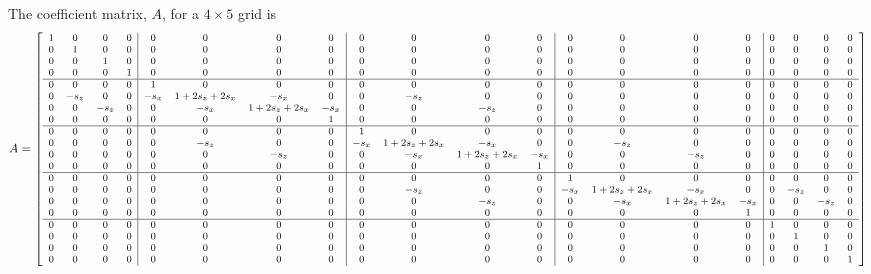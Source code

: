 \begin{landscape}
 	The coefficient matrix, $A$, for a $4 \times 5$ grid is
\begin{equation}
\setcounter{MaxMatrixCols}{20}
\footnotesize{
A = \begin{bmatrix}
    \begin{array}{cccc|cccc|cccc|cccc|cccc}
       1 & 0 & 0 & 0 & 0 & 0 & 0 & 0 & 0 & 0 & 0 & 0 & 0 & 0 & 0 & 0 & 0 & 0 & 0 & 0 \\ %
       0 & 1 & 0 & 0 & 0 & 0 & 0 & 0 & 0 & 0 & 0 & 0 & 0 & 0 & 0 & 0 & 0 & 0 & 0 & 0 \\ %
       0 & 0 & 1 & 0 & 0 & 0 & 0 & 0 & 0 & 0 & 0 & 0 & 0 & 0 & 0 & 0 & 0 & 0 & 0 & 0 \\ %
       0 & 0 & 0 & 1 & 0 & 0 & 0 & 0 & 0 & 0 & 0 & 0 & 0 & 0 & 0 & 0 & 0 & 0 & 0 & 0 \\ %
         \hline
       0 & 0 & 0 & 0 & 1 & 0 & 0 & 0 & 0 & 0 & 0 & 0 & 0 & 0 & 0 & 0 & 0 & 0 & 0 & 0 \\ %
       0 & -s_z & 0 & 0 & -s_x & 1+2s_z+2s_x & -s_x & 0 & 0 & -s_z & 0 & 0 & 0 & 0 & 0 & 0 & 0 & 0 & 0 & 0 \\ %
       0 & 0 & -s_z & 0 & 0 & -s_x & 1+2s_z+2s_x & -s_x & 0 & 0 & -s_z & 0 & 0 & 0 & 0 & 0 & 0 & 0 & 0 & 0 \\ %
       0 & 0 & 0 & 0 & 0 & 0 & 0 & 1 & 0 & 0 & 0 & 0 & 0 & 0 & 0 & 0 & 0 & 0 & 0 & 0 \\ %
       \hline
       0 & 0 & 0 & 0 & 0 & 0 & 0 & 0 & 1 & 0 & 0 & 0 & 0 & 0 & 0 & 0 & 0 & 0 & 0 & 0 \\ %
       0 & 0 & 0 & 0 & 0 & -s_z & 0 & 0 & -s_x & 1+2s_z+2s_x & -s_x & 0 & 0 & -s_z & 0 & 0 & 0 & 0 & 0 & 0 \\ %
       0 & 0 & 0 & 0 & 0 & 0 & -s_z & 0 & 0 & -s_x & 1+2s_z+2s_x & -s_x & 0 & 0 & -s_z & 0 & 0 & 0 & 0 & 0 \\ %
       0 & 0 & 0 & 0 & 0 & 0 & 0 & 0 & 0 & 0 & 0 & 1 & 0 & 0 & 0 & 0 & 0 & 0 & 0 & 0 \\ %
       \hline
       0 & 0 & 0 & 0 & 0 & 0 & 0 & 0 & 0 & 0 & 0 & 0 & 1 & 0 & 0 & 0 & 0 & 0 & 0 & 0 \\ %
       0 & 0 & 0 & 0 & 0 & 0 & 0 & 0 & 0 & -s_z & 0 & 0 & -s_x & 1+2s_z+2s_x & -s_x & 0 & 0 & -s_z & 0 & 0 \\ %
       0 & 0 & 0 & 0 & 0 & 0 & 0 & 0 & 0 & 0 & -s_z & 0 & 0 & -s_x & 1+2s_z+2s_x & -s_x & 0 & 0 & -s_z & 0 \\ %
       0 & 0 & 0 & 0 & 0 & 0 & 0 & 0 & 0 & 0 & 0 & 0 & 0 & 0 & 0 & 1 & 0 & 0 & 0 & 0 \\ %
       \hline
       0 & 0 & 0 & 0 & 0 & 0 & 0 & 0 & 0 & 0 & 0 & 0 & 0 & 0 & 0 & 0 & 1 & 0 & 0 & 0 \\ %
       0 & 0 & 0 & 0 & 0 & 0 & 0 & 0 & 0 & 0 & 0 & 0 & 0 & 0 & 0 & 0 & 0 & 1 & 0 & 0 \\ %
       0 & 0 & 0 & 0 & 0 & 0 & 0 & 0 & 0 & 0 & 0 & 0 & 0 & 0 & 0 & 0 & 0 & 0 & 1 & 0 \\ %
       0 & 0 & 0 & 0 & 0 & 0 & 0 & 0 & 0 & 0 & 0 & 0 & 0 & 0 & 0 & 0 & 0 & 0 & 0 & 1 \\ %
   \end{array}
    \end{bmatrix}
\label{eq:2D54A}
}
\end{equation}


\end{landscape}
